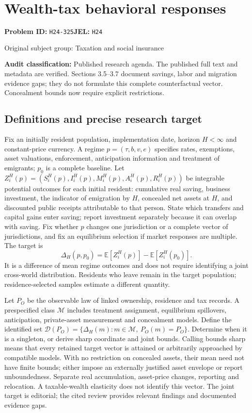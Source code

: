 \documentclass[11pt,a4paper]{article}
\begin{document}
\section*{Wealth-tax behavioral responses}
\textbf{Problem ID:} \texttt{H24-325}\quad \textbf{JEL:} \texttt{H24}\par
\label{problem:OP-0472}
{\sffamily\small\color{muted}Original subject group: Taxation and social insurance\par}
\label{definitions:problem:30007754}
\textbf{Audit classification:} Published research agenda. The published full text and metadata are verified. Sections 3.5–3.7 document savings, labor and migration evidence gaps; they do not formulate this complete counterfactual vector. Concealment bounds now require explicit restrictions.
\subsection*{Definitions and precise research target}
Fix an initially resident population, implementation date, horizon \(H<\infty\) and constant-price currency. A regime \(p=(\tau,b,v,e)\) specifies rates, exemptions, asset valuations, enforcement, anticipation information and treatment of emigrants; \(p_0\) is a complete baseline. Let \(Z_i^H(p)=(S_i^H(p),I_i^H(p),M_i^H(p),A_i^H(p),R_i^H(p))\) be integrable potential outcomes for each initial resident: cumulative real saving, business investment, the indicator of emigration by \(H\), concealed net assets at \(H\), and discounted public receipts attributable to that person. State which transfers and capital gains enter saving; report investment separately because it can overlap with saving. Fix whether \(p\) changes one jurisdiction or a complete vector of jurisdictions, and fix an equilibrium selection if market responses are multiple. The target is
\[
 \Delta_H(p,p_0)=\mathbb E[Z_i^H(p)]-\mathbb E[Z_i^H(p_0)].
\]
It is a difference of mean regime outcomes and does not require identifying a joint cross-world distribution. Residents who leave remain in the target population; residence-selected samples estimate a different quantity.

Let \(P_O\) be the observable law of linked ownership, residence and tax records. A prespecified class \(\mathcal M\) includes treatment assignment, equilibrium spillovers, anticipation, private-asset measurement and concealment models. Define the identified set \(\mathcal D(P_O)=\{\Delta_H(m):m\in\mathcal M,\ P_O(m)=P_O\}\). Determine when it is a singleton, or derive sharp coordinate and joint bounds. Calling bounds sharp means that every retained target vector is attained or arbitrarily approached by compatible models. With no restriction on concealed assets, their mean need not have finite bounds; either impose an externally justified asset envelope or report unboundedness. Separate real accumulation, asset-price changes, reporting and relocation. A taxable-wealth elasticity does not identify this vector. The joint target is editorial; the cited review provides relevant findings and documented evidence gaps.
\end{document}
